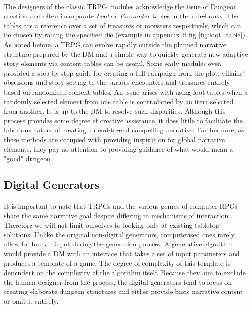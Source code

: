 \documentclass{UoYCSproject}
\begin{document}
\paragraph{}
The designers of the classic TRPG modules acknowledge the issue of Dungeon creation and often incorporate \textit{Loot} or \textit{Encounter} tables in the rule-books. The tables are a reference over a set of treasures or monsters respectively, which can be chosen by rolling the specified die (example in appendix B fig \ref{fig:loot_table}). As noted before, a TRPG can evolve rapidly outside the planned narrative structure prepared by the DM and a simple way to quickly generate new adaptive story elements via content tables can be useful. Some early modules even provided a step-by-step guide for creating a full campaign from the plot, villains' obsessions and story setting to the various encounters and treasures \parencite{ADnD} entirely based on randomised content tables. An issue arises with using loot tables when a randomly selected element from one table is contradicted by an item selected from another. It is up to the DM to resolve such disparities. Although this process provides some degree of creative assistance, it does little to facilitate the laborious nature of creating an end-to-end compelling narrative. Furthermore, as these methods are occupied with providing inspiration for global narrative elements, they pay no attention to providing guidance of what would mean a "good" dungeon.

\subsection{Digital Generators}
\label{subsec:DigGen}
\paragraph{}
It is important to note that TRPGs and the various genres of computer RPGs share the same narrative goal despite differing in mechanisms of interaction \parencite{Tychsen2006}. Therefore we will not limit ourselves to looking only at existing tabletop solutions.
Unlike the original non-digital generators, computerised ones rarely allow for human input during the generation process. A generative algorithm would provide a DM with an interface that takes a set of input parameters and produces a template of a game. The degree of complexity of this template is dependent on the complexity of the algorithm itself. Because they aim to exclude the human designer from the process, the digital generators tend to focus on creating elaborate dungeon structures and either provide basic narrative content or omit it entirely.
\end{document}
